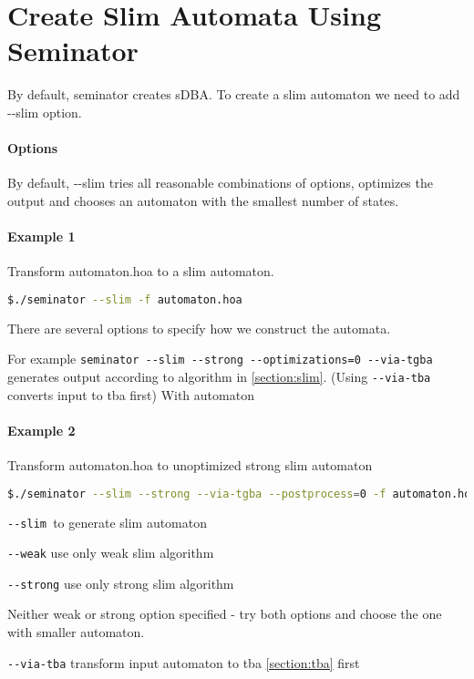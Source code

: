 \documentclass[
	digital,
nolof, nolot
]{fithesis3}
\begin{document}
		\section{Create Slim Automata Using Seminator}
		By default, seminator creates sDBA. To create a slim automaton we need to add -{}-slim option. 
		\paragraph{Options} By default, -{}-slim tries all reasonable combinations of options, optimizes the output and chooses an automaton with the smallest number of states.
		
		\paragraph{Example 1}
		Transform automaton.hoa to a slim automaton.

		\begin{lstlisting}[language=bash]
$./seminator --slim -f automaton.hoa
		\end{lstlisting}
		
		There are several options to specify how we construct the automata.
		
		For example \texttt{seminator -{}-slim -{}-strong -{}-optimizations=0 -{}-via-tgba} generates output according to algorithm in \ref{section:slim}. (Using \texttt{-{}-via-tba} converts input to tba first) With automaton
		
		
		\paragraph{Example 2}
		Transform automaton.hoa to unoptimized strong slim automaton
		\begin{lstlisting}[language=bash]
$./seminator --slim --strong --via-tgba --postprocess=0 -f automaton.hoa
		\end{lstlisting}
		
		 
		
		\texttt{-{}-slim }to generate slim automaton
		
		\texttt{-{}-weak} use only weak slim algorithm
		
		\texttt{-{}-strong} use only strong slim algorithm
		
		Neither weak or strong option specified - try both options  and choose the one with smaller automaton.
		
		\texttt{-{}-via-tba} transform input automaton to tba \ref{section:tba} first
		
\end{document}
